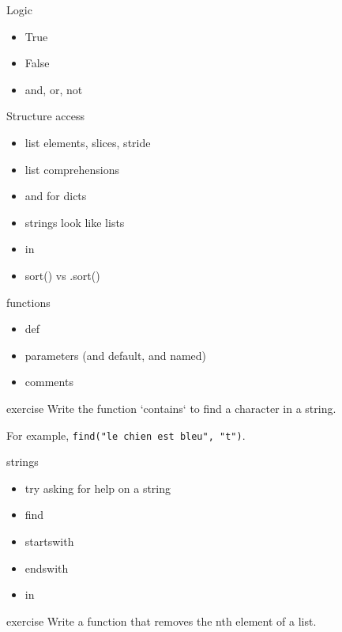 \begin{frame}{Logic}
  \begin{itemize}
  \item True
  \item False
  \item and, or, not
  \end{itemize}
\end{frame}

\begin{frame}{Structure access}
  \begin{itemize}
  \item list elements, slices, stride
  \item list comprehensions
  \item and for dicts
  \item strings look like lists
  \item in
  \item sort() vs .sort()
  \end{itemize}
\end{frame}

\begin{frame}{functions}
  \begin{itemize}
  \item def
  \item parameters (and default, and named)
  \item comments
  \end{itemize}
\end{frame}

\begin{frame}{exercise}
  Write the function `contains` to find a character in a string.

  For example, \texttt{find("le chien est bleu", "t")}.
\end{frame}

\begin{frame}{strings}
  \begin{itemize}
  \item try asking for help on a string
  \item find
  \item startswith
  \item endswith
  \item in
  \end{itemize}
\end{frame}

\begin{frame}{exercise}
  Write a function that removes the nth element of a list.
\end{frame}

